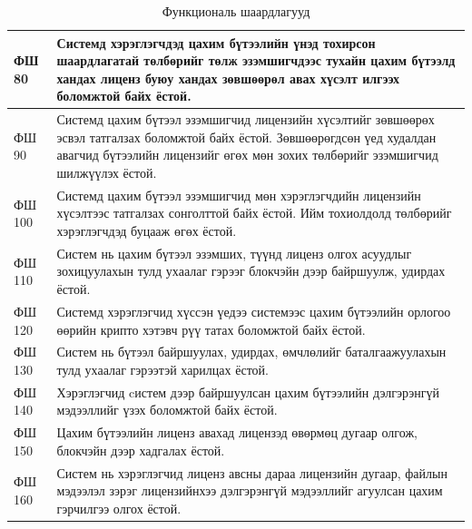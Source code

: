 \begin{table}[h!]
   \centering
   \begin{tabularx}{\textwidth}{|p{}|X|}
      \hline ФШ 80 & Системд хэрэглэгчдэд цахим бүтээлийн үнэд тохирсон шаардлагатай төлбөрийг төлж эзэмшигчдээс тухайн цахим бүтээлд хандах лиценз буюу хандах зөвшөөрөл авах хүсэлт илгээх боломжтой байх ёстой.
      \\ \hline  ФШ 90 & Системд цахим бүтээл эзэмшигчид лицензийн хүсэлтийг зөвшөөрөх эсвэл татгалзах боломжтой байх ёстой. Зөвшөөрөгдсөн үед худалдан авагчид бүтээлийн лицензийг өгөх мөн зохих төлбөрийг эзэмшигчид шилжүүлэх ёстой.
      \\ \hline ФШ 100 &  Системд цахим бүтээл эзэмшигчид мөн хэрэглэгчдийн лицензийн хүсэлтээс татгалзах сонголттой байх ёстой. Ийм тохиолдолд төлбөрийг хэрэглэгчдэд буцааж өгөх ёстой.
      \\ \hline ФШ 110 &  Систем нь цахим бүтээл эзэмших, түүнд лиценз олгох асуудлыг зохицуулахын тулд ухаалаг гэрээг блокчэйн дээр байршуулж, удирдах ёстой.
      \\ \hline ФШ 120 &  Системд хэрэглэгчид хүссэн үедээ системээс цахим бүтээлийн орлогоо өөрийн крипто хэтэвч рүү татах боломжтой байх ёстой.
      \\ \hline ФШ 130 &  Систем нь бүтээл байршуулах, удирдах, өмчлөлийг баталгаажуулахын тулд ухаалаг гэрээтэй харилцах ёстой.
      \\ \hline ФШ 140 &  Хэрэглэгчид cистем дээр байршуулсан цахим бүтээлийн дэлгэрэнгүй мэдээллийг үзэх боломжтой байх ёстой.
      \\ \hline ФШ 150 &  Цахим бүтээлийн лиценз авахад лицензэд өвөрмөц дугаар олгож, блокчэйн дээр хадгалах ёстой.
      \\ \hline ФШ 160 &  Систем нь хэрэглэгчид лиценз авсны дараа лицензийн дугаар, файлын мэдээлэл зэрэг лицензийнхээ дэлгэрэнгүй мэдээллийг агуулсан цахим гэрчилгээ олгох ёстой.
      \\ \hline
	\end{tabularx}
   \caption{Функциональ шаардлагууд}
\end{table}
\clearpage

